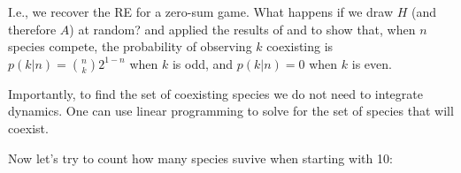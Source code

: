 \documentclass[
]{book}
\newenvironment{Shaded}{\begin{snugshade}}{\end{snugshade}}
\newcommand{\CommentTok}[1]{\textcolor[rgb]{0.56,0.35,0.01}{\textit{#1}}}
\newcommand{\ControlFlowTok}[1]{\textcolor[rgb]{0.13,0.29,0.53}{\textbf{#1}}}
\newcommand{\DecValTok}[1]{\textcolor[rgb]{0.00,0.00,0.81}{#1}}
\newcommand{\KeywordTok}[1]{\textcolor[rgb]{0.13,0.29,0.53}{\textbf{#1}}}
\newcommand{\NormalTok}[1]{#1}
\newcommand{\OperatorTok}[1]{\textcolor[rgb]{0.81,0.36,0.00}{\textbf{#1}}}
\newcommand{\StringTok}[1]{\textcolor[rgb]{0.31,0.60,0.02}{#1}}
\begin{document}
I.e., we recover the RE for a zero-sum game. What happens if we draw \(H\) (and therefore \(A\)) at random? \citet{allesina2011competitive} and \citet{grilli2017higher} applied the results of \citet{fisher1995optimal} and \citet{brandl2017distribution} to show that, when \(n\) species compete, the probability of observing \(k\) coexisting is \(p(k|n) = \binom{n}{k} 2^{1-n}\) when \(k\) is odd, and \(p(k|n) = 0\) when \(k\) is even.

Importantly, to find the set of coexisting species we do not need to integrate dynamics. One can use linear programming to solve for the set of species that will coexist.

\begin{Shaded}
\end{Shaded}

Now let's try to count how many species suvive when starting with 10:
\end{document}
